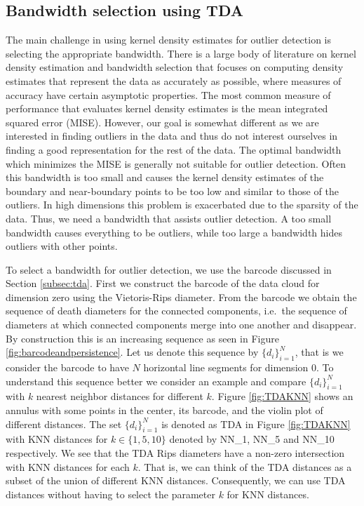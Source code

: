 \documentclass[11pt,a4paper,]{article}
\theoremstyle{definition}
\theoremstyle{definition}
\theoremstyle{definition}
\theoremstyle{remark}
\begin{document}
\hypertarget{subsec:selectingBandwidth}{%
\subsection{Bandwidth selection using TDA}\label{subsec:selectingBandwidth}}

The main challenge in using kernel density estimates for outlier detection is selecting the appropriate bandwidth. There is a large body of literature on kernel density estimation and bandwidth selection \autocite{Scott1994,Wang2019} that focuses on computing density estimates that represent the data as accurately as possible, where measures of accuracy have certain asymptotic properties. The most common measure of performance that evaluates kernel density estimates is the mean integrated squared error (MISE). However, our goal is somewhat different as we are interested in finding outliers in the data and thus do not interest ourselves in finding a good representation for the rest of the data. The optimal bandwidth which minimizes the MISE is generally not suitable for outlier detection. Often this bandwidth is too small and causes the kernel density estimates of the boundary and near-boundary points to be too low and similar to those of the outliers. In high dimensions this problem is exacerbated due to the sparsity of the data. Thus, we need a bandwidth that assists outlier detection. A too small bandwidth causes everything to be outliers, while too large a bandwidth hides outliers with other points.

To select a bandwidth for outlier detection, we use the barcode discussed in Section \ref{subsec:tda}. First we construct the barcode of the data cloud for dimension zero using the Vietoris-Rips diameter. From the barcode we obtain the sequence of death diameters for the connected components, i.e.~the sequence of diameters at which connected components merge into one another and disappear. By construction this is an increasing sequence as seen in Figure \ref{fig:barcodeandpersistence}. Let us denote this sequence by \(\{d_i\}_{i = 1}^N\), that is we consider the barcode to have \(N\) horizontal line segments for dimension \(0\). To understand this sequence better we consider an example and compare \(\{d_i\}_{i = 1}^N\) with \(k\) nearest neighbor distances for different \(k\). Figure \ref{fig:TDAKNN} shows an annulus with some points in the center, its barcode, and the violin plot of different distances. The set \(\{d_i\}_{i = 1}^N\) is denoted as TDA in Figure \ref{fig:TDAKNN} with KNN distances for \(k \in \{1, 5, 10\}\) denoted by NN\_1, NN\_5 and NN\_10 respectively. We see that the TDA Rips diameters have a non-zero intersection with KNN distances for each \(k\). That is, we can think of the TDA distances as a subset of the union of different KNN distances. Consequently, we can use TDA distances without having to select the parameter \(k\) for KNN distances.
\end{document}
